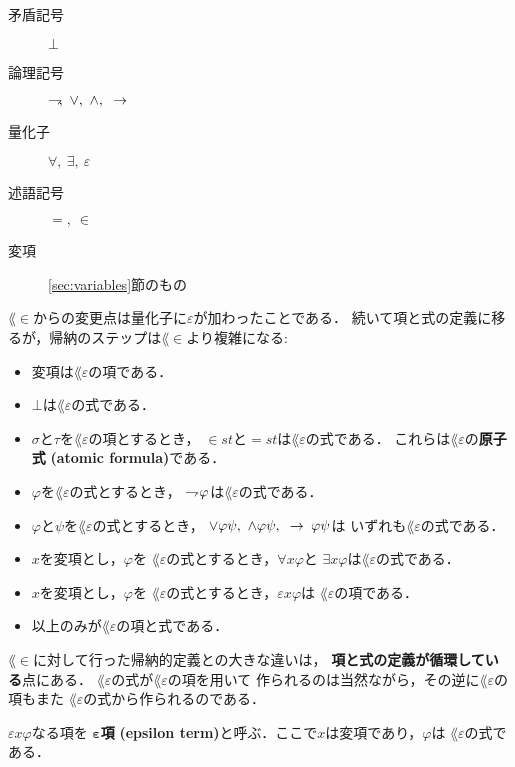 	\begin{description}
		\item[矛盾記号] $\bot$
		\item[論理記号] $\negation,\ \vee,\ \wedge,\ \rarrow$
		\item[量化子] $\forall,\ \exists,\ \varepsilon$
		\item[述語記号] $=,\ \in$
		\item[変項] \ref{sec:variables}節のもの
	\end{description}
	
	$\lang{\in}$からの変更点は量化子に$\varepsilon$が加わったことである．
	続いて項と式の定義に移るが，帰納のステップは$\lang{\in}$より複雑になる:
	
	\begin{itemize}
		\item 変項は$\lang{\varepsilon}$の項である．
		\item $\bot$は$\lang{\varepsilon}$の式である．
		\item $\sigma$と$\tau$を$\lang{\varepsilon}$の項とするとき，
			$\in st$と$=st$は$\lang{\varepsilon}$の式である．
			これらは$\lang{\varepsilon}$の{\bf 原子式}
			{\bf (atomic formula)}である．
		\item $\varphi$を$\lang{\varepsilon}$の式とするとき，
			$\rightharpoondown\hspace{-0.25em} \varphi$は$\lang{\varepsilon}$の式である．
		\item $\varphi$と$\psi$を$\lang{\varepsilon}$の式とするとき，
			$\vee \varphi \psi,\ \wedge \varphi \psi,\ \rarrow \varphi \psi$は
			いずれも$\lang{\varepsilon}$の式である．
		\item $x$を変項とし，$\varphi$を
			$\lang{\varepsilon}$の式とするとき，$\forall x \varphi$と
			$\exists x \varphi$は$\lang{\varepsilon}$の式である．
		\item $x$を変項とし，$\varphi$を
			$\lang{\varepsilon}$の式とするとき，$\varepsilon x \varphi$は
			$\lang{\varepsilon}$の項である．
		\item 以上のみが$\lang{\varepsilon}$の項と式である．
	\end{itemize}
	
	$\lang{\in}$に対して行った帰納的定義との大きな違いは，
	{\bf 項と式の定義が循環している}点にある．
	$\lang{\varepsilon}$の式が$\lang{\varepsilon}$の項を用いて
	作られるのは当然ながら，その逆に$\lang{\varepsilon}$の項もまた
	$\lang{\varepsilon}$の式から作られるのである．
	
	\begin{screen}
		\begin{metadfn}[$\varepsilon$項]
			$\varepsilon x \varphi$なる項を
			{\bf ${\boldsymbol \varepsilon}$項}
			{\bf (epsilon term)}と呼ぶ．ここで$x$は変項であり，$\varphi$は
			$\lang{\varepsilon}$の式である．
		\end{metadfn}
	\end{screen}
	
